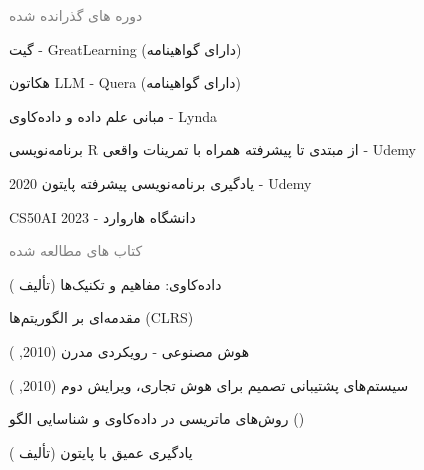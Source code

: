 \documentclass[a4paper]{deedy-persian} %
\begin{document}
\begin{minipage}[t]{0.62\textwidth}
\sectionspace %
\vspace{\topsep}
\textcolor{gray}{\huge {دوره های گذرانده شده}}
\vspace{\itemsep} %
\begin{tightitemize}
\item گیت - GreatLearning (دارای گواهینامه)
\item هکاتون LLM - Quera (دارای گواهینامه)
\item مبانی علم داده و داده‌کاوی - Lynda
\item برنامه‌نویسی R از مبتدی تا پیشرفته همراه با تمرینات واقعی - Udemy
\item یادگیری برنامه‌نویسی پیشرفته پایتون 2020 - Udemy
\item CS50AI 2023 - دانشگاه هاروارد
\end{tightitemize}
\sectionspace %
\vspace{\topsep}
\textcolor{gray}{\huge {کتاب های مطالعه شده}}
\vspace{\itemsep} %
\begin{tightitemize}
\item داده‌کاوی: مفاهیم و تکنیک‌ها (تألیف )
\item مقدمه‌ای بر الگوریتم‌ها (CLRS)
\item هوش مصنوعی - رویکردی مدرن (2010, )
\item سیستم‌های پشتیبانی تصمیم برای هوش تجاری، ویرایش دوم (2010, )
\item روش‌های ماتریسی در داده‌کاوی و شناسایی الگو ()
\item یادگیری عمیق با پایتون (تألیف )
\end{tightitemize}
\vspace{\topsep} 


\end{minipage} %
\hfill
\end{document}
